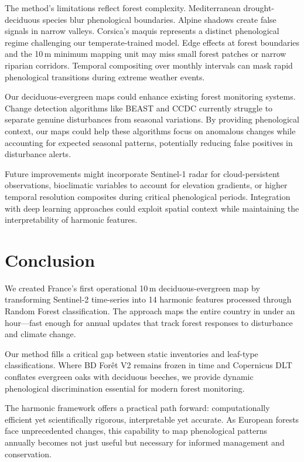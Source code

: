 \documentclass[utf8]{FrontiersinHarvard}
\begin{document}
The method's limitations reflect forest complexity. Mediterranean drought-deciduous species blur phenological boundaries. Alpine shadows create false signals in narrow valleys. Corsica's maquis represents a distinct phenological regime challenging our temperate-trained model. Edge effects at forest boundaries and the 10\,m minimum mapping unit may miss small forest patches or narrow riparian corridors. Temporal compositing over monthly intervals can mask rapid phenological transitions during extreme weather events.

Our deciduous-evergreen maps could enhance existing forest monitoring systems. Change detection algorithms like BEAST \citep{Zhao2019} and CCDC \citep{Zhu2014} currently struggle to separate genuine disturbances from seasonal variations. By providing phenological context, our maps could help these algorithms focus on anomalous changes while accounting for expected seasonal patterns, potentially reducing false positives in disturbance alerts.

Future improvements might incorporate Sentinel-1 radar for cloud-persistent observations, bioclimatic variables to account for elevation gradients, or higher temporal resolution composites during critical phenological periods. Integration with deep learning approaches could exploit spatial context while maintaining the interpretability of harmonic features.


\section{Conclusion}

We created France's first operational 10\,m deciduous-evergreen map by transforming Sentinel-2 time-series into 14 harmonic features processed through Random Forest classification. The approach maps the entire country in under an hour—fast enough for annual updates that track forest responses to disturbance and climate change.

Our method fills a critical gap between static inventories and leaf-type classifications. Where BD Forêt V2 remains frozen in time and Copernicus DLT conflates evergreen oaks with deciduous beeches, we provide dynamic phenological discrimination essential for modern forest monitoring.

The harmonic framework offers a practical path forward: computationally efficient yet scientifically rigorous, interpretable yet accurate. As European forests face unprecedented changes, this capability to map phenological patterns annually becomes not just useful but necessary for informed management and conservation.
\end{document}
